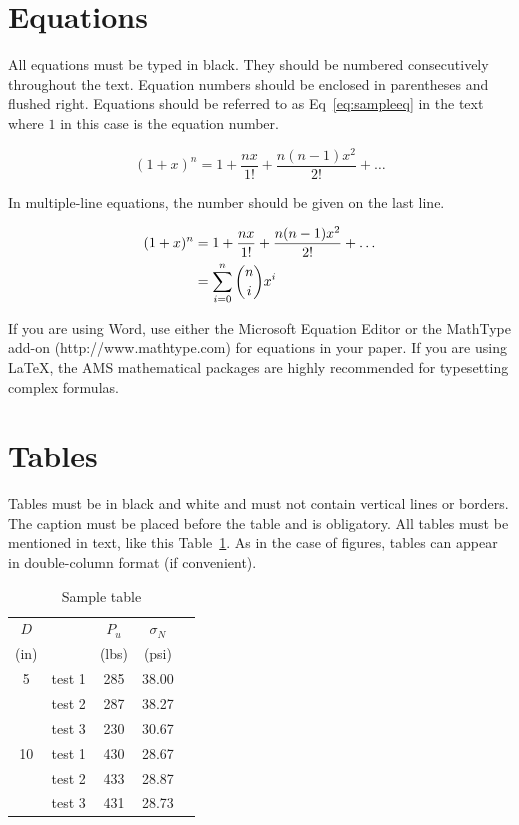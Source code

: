 \documentclass{jcst}
\begin{document}
\section{Equations}
All equations must be typed in black. They should be numbered
consecutively throughout the text. Equation numbers should be enclosed in
parentheses and flushed right. Equations should be referred to as Eq~\eqref{eq:sampleeq}
in the text where $1$ in this case is the equation number.

 \begin{equation}
   \label{eq:sampleeq}
   (1+x)^n=1+\frac{nx}{1!}+\frac{n (n-1) x^2}{2!}+\dots
 \end{equation}

 In multiple-line equations, the number should be given on the last line.

\begin{align}
\label{eq:aligned}
(1+x)^n&=1+\frac{nx}{1!}+\frac{n (n-1) x^2}{2!}+\dots \notag
      \\&=\sum_{i=0}^{n} {n\choose i} x^i
 \end{align}

 If you are using Word, use either the Microsoft Equation Editor or the MathType add-on
(http://www.mathtype.com) for equations in your paper. If you are using LaTeX, the
AMS mathematical packages are highly recommended for typesetting complex formulas.

\section{Tables}

Tables must be in black and white and must not contain vertical lines or borders.
The caption must be placed before the table and is obligatory. All tables must be mentioned in text, like this Table~\ref{tab:sampletable}. As in the case of figures, tables can appear in double-column format (if convenient).

\begin{table}[ht]
\caption{\label{tab:sampletable}Sample table}
\centering
\begin{tabular}{clccc}
\toprule
$D$ &               & $P_u$      & $\sigma_N$    \\
(in)&               & (lbs)      & (psi)          \\ \otoprule
%
5    & test 1      & 285         & 38.00          \\
& test 2      & 287         & 38.27          \\
& test 3      & 230         & 30.67          \\ \midrule
10   & test 1      & 430         & 28.67          \\
& test 2      & 433         & 28.87          \\
& test 3      & 431         & 28.73          \\ \bottomrule
\end{tabular}
\end{table}
\end{document}
